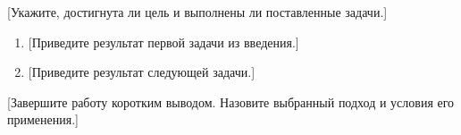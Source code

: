 
[Укажите, достигнута ли цель и выполнены ли поставленные задачи.]

\begin{enumerate}
    \item {}[Приведите результат первой задачи из введения.]
    \item {}[Приведите результат следующей задачи.]
\end{enumerate}

[Завершите работу коротким выводом. Назовите выбранный подход и условия его применения.]
